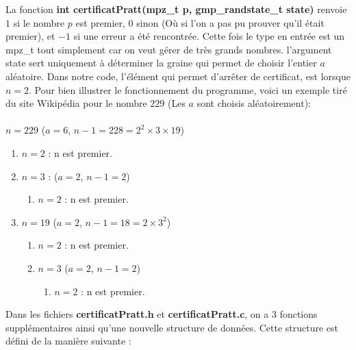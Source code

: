 \documentclass[a4paper]{article}
\begin{document}
La fonction \textbf{int certificatPratt(mpz\_t p, gmp\_randstate\_t state)}
renvoie $1$ si le nombre $p$ est premier, $0$ sinon (Où si l'on a pas pu
prouver qu'il était premier), et $-1$ si une erreur a été rencontrée.
Cette fois le type en entrée est un mpz\_t tout simplement car on veut
gérer de très grands nombres. l'argument state sert uniquement à déterminer
la graine qui permet de choisir l'entier $a$ aléatoire.
Dans notre code, l'élément qui permet d'arrêter de certificat, est lorsque
$n = 2$. Pour bien illustrer le fonctionnement du programme, voici un exemple
tiré du site Wikipédia pour le nombre $229$ (Les $a$ sont choisis aléatoirement):
\\
\\
$n=229$ ($a=6$, $n-1=228=2^2\times 3\times 19$)
\begin{enumerate}
	\item $n=2$ : n est premier.
	\item $n=3$ : ($a=2$, $n-1=2$)
	\begin{enumerate}
		\item $n=2$ : n est premier.
	\end {enumerate}
	\item $n=19$ ($a=2$, $n-1=18=2\times 3^2$)
	\begin{enumerate}
		\item $n=2$ : n est premier.
		\item $n=3$ ($a=2$, $n-1=2$)
		\begin{enumerate}
			\item $n=2$ : n est premier.
		\end {enumerate}
	\end {enumerate}
\end {enumerate}


Dans les fichiers \textbf{certificatPratt.h} et \textbf{certificatPratt.c},
on a $3$ fonctions supplémentaires ainsi qu'une nouvelle structure de données.
Cette structure est défini de la manière suivante :
\end{document}
